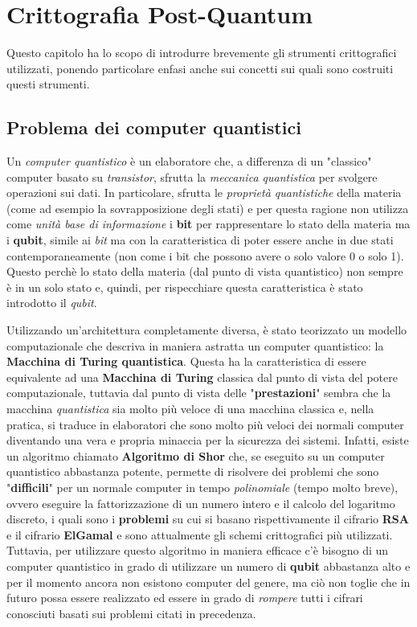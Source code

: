 \chapter{Crittografia Post-Quantum}

\begin{citazione}
    Questo capitolo ha lo scopo di introdurre brevemente gli strumenti crittografici utilizzati, ponendo particolare enfasi anche sui concetti sui quali sono costruiti questi strumenti.
\end{citazione}

\section{Problema dei computer quantistici}
Un \emph{computer quantistico} è un elaboratore che, a differenza di un "classico" computer basato su \emph{transistor}, sfrutta la \emph{meccanica quantistica} per svolgere operazioni sui dati. In particolare, sfrutta le \emph{proprietà quantistiche} della materia (come ad esempio la sovrapposizione degli stati) e per questa ragione non utilizza come \emph{unità base di informazione} i \textbf{bit} per rappresentare lo stato della materia ma i \textbf{qubit}, simile ai \emph{bit} ma con la caratteristica di poter essere anche in due stati contemporaneamente (non come i bit che possono avere o solo valore 0 o solo 1). Questo perchè lo stato della materia (dal punto di vista quantistico) non sempre è in un solo stato e, quindi, per rispecchiare questa caratteristica è stato introdotto il \emph{qubit}. \cite{wikipedia_quantum_computing}

Utilizzando un'architettura completamente diversa, è stato teorizzato un modello computazionale che descriva in maniera astratta un computer quantistico: la \textbf{Macchina di Turing quantistica}. Questa ha la caratteristica di essere equivalente ad una \textbf{Macchina di Turing} classica dal punto di vista del potere computazionale, tuttavia dal punto di vista delle "\textbf{prestazioni}" sembra che la macchina \emph{quantistica} sia molto più veloce di una macchina classica e, nella pratica, si traduce in elaboratori che sono molto più veloci dei normali computer diventando una vera e propria minaccia per la sicurezza dei sistemi. Infatti, esiste un algoritmo chiamato \textbf{Algoritmo di Shor} che, se eseguito su un computer quantistico abbastanza potente, permette di risolvere dei problemi che sono "\textbf{difficili}" per un normale computer in tempo \emph{polinomiale} (tempo molto breve), ovvero eseguire la fattorizzazione di un numero intero e il calcolo del logaritmo discreto, i quali sono i \textbf{problemi} su cui si basano rispettivamente il cifrario \textbf{RSA} e il cifrario \textbf{ElGamal} e sono attualmente gli schemi crittografici più utilizzati. Tuttavia, per utilizzare questo algoritmo in maniera efficace c'è bisogno di un computer quantistico in grado di utilizzare un numero di \textbf{qubit} abbastanza alto e per il momento ancora non esistono computer del genere, ma ciò non toglie che in futuro possa essere realizzato ed essere in grado di \emph{rompere} tutti i cifrari conosciuti basati sui problemi citati in precedenza. \cite{wikipedia_quantum_computing}

